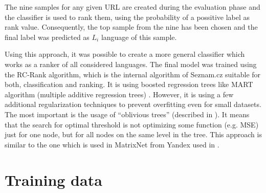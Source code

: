 \documentclass{acm_proc_article-sp}
\begin{document}
  The nine samples for any given URL are created during the evaluation phase
  and the classifier is used to rank them, using the probability of a possitive label as rank value.
  Consequently, the top sample from the nine has been chosen and the final label was predicted as $L_i$ language of this sample.

  Using this approach, it was possible to create a more general classifier which works as a ranker of all considered languages.
  The final model was trained using the RC-Rank algorithm, which is the internal algorithm of Seznam.cz suitable for both, classification and ranking.
  It is using boosted regression trees like MART algorithm (multiple additive regression trees) \cite{friedman:mart}. 
  However, it is using a few additional regularization techniques to prevent overfitting even for small datasets.
  The most important is the usage of “oblivious trees” (described in \cite{langley:oblivious}). 
  It means that the search for optimal threshold is not optimizing some function (e.g. MSE) just for one node, 
  but for all nodes on the same level in the tree. 
  This approach is similar to the one which is used in MatrixNet from Yandex used in \cite{trofimov:matrixnet}.



  \section{Training data}
\end{document}
